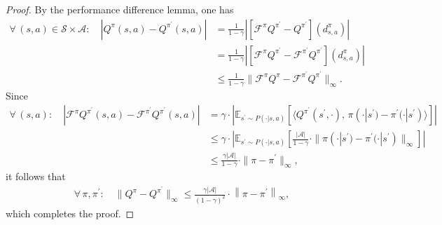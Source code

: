 \documentclass[10pt]{article}
\newcommand{\calA}{\mathcal{A}}
\newcommand{\calS}{\mathcal{S}}
\newcommand{\calF}{\mathcal{F}}
\newcommand{\E}{\mathbb{E}}
\newcommand{\ls}{\left}
\newcommand{\rs}{\right}
\theoremstyle{plain}
\theoremstyle{definition}
\begin{document}
\begin{proof}
    By the performance difference lemma, one has
    \begin{align*}
    \forall\, (s,a) \in \calS \times \calA: \quad | Q^{\pi}(s,a) - Q^{\pi^\prime}(s,a) | &= \frac{1}{1-\gamma} | [\calF^{\pi}Q^{\pi^\prime} - Q^{\pi^\prime}](d^{\pi}_{s,a}) | \\
    &= \frac{1}{1-\gamma} | [\calF^{\pi}Q^{\pi^\prime} - \calF^{\pi^\prime}Q^{\pi^\prime}](d^{\pi}_{s,a}) | \\
    &\leq \frac{1}{1-\gamma} \| \calF^{\pi} Q^{\pi} - \calF^{\pi^\prime} Q^{\pi^\prime} \|_\infty.
    \end{align*}
    Since
    \begin{align*}
        \forall\, (s,a) : \quad | \calF^{\pi} Q^{\pi^\prime}(s,a) - \calF^{\pi^\prime} Q^{\pi^\prime}(s,a) | &= \gamma \cdot | \E_{s^\prime \sim P(\cdot|s,a)} [ \langle Q^{\pi^\prime} (s^\prime, \cdot), \, \pi(\cdot|s^\prime) - \pi^\prime(\cdot|s^\prime) \rangle ] | \\
        &\leq \gamma \cdot | \E_{s^\prime \sim P(\cdot|s,a)} [ \frac{|\calA|}{1-\gamma} \cdot \| \pi(\cdot|s^\prime) - \pi^\prime(\cdot|s^\prime) \|_\infty ] | \\
        &\leq \frac{\gamma |\calA|}{1-\gamma} \cdot \| \pi - \pi^\prime \|_\infty,
    \end{align*}
   it follows that
    \begin{align*}
        \forall\, \pi, \pi^\prime: \quad \| Q^\pi - Q^{\pi^\prime} \|_\infty \leq \frac{\gamma |\calA|}{(1-\gamma)^2} \cdot \ls\| \pi - \pi^\prime \rs\|_\infty,
    \end{align*}
    which completes the proof.
\end{proof}
\end{document}
